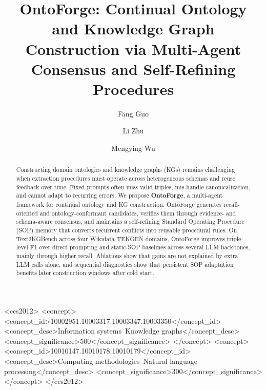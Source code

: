 \documentclass[sigconf]{acmart}
\begin{document}
\title{OntoForge: Continual Ontology and Knowledge Graph Construction via Multi-Agent Consensus and Self-Refining Procedures}

\author{Fang Guo}

\author{Li Zhu}

\author{Mengying Wu}

\renewcommand{\shortauthors}{Fang Guo, Li Zhu, and Mengying Wu}

\begin{CCSXML}
<ccs2012>
<concept>
<concept_id>10002951.10003317.10003347.10003350</concept_id>
<concept_desc>Information systems~Knowledge graphs</concept_desc>
<concept_significance>500</concept_significance>
</concept>
<concept>
<concept_id>10010147.10010178.10010179</concept_id>
<concept_desc>Computing methodologies~Natural language processing</concept_desc>
<concept_significance>300</concept_significance>
</concept>
</ccs2012>
\end{CCSXML}


\begin{abstract}
Constructing domain ontologies and knowledge graphs (KGs) remains challenging when extraction procedures must operate across heterogeneous schemas and reuse feedback over time. Fixed prompts often miss valid triples, mis-handle canonicalization, and cannot adapt to recurring errors. We propose \textbf{OntoForge}, a multi-agent framework for continual ontology and KG construction. OntoForge generates recall-oriented and ontology-conformant candidates, verifies them through evidence- and schema-aware consensus, and maintains a self-refining Standard Operating Procedure (SOP) memory that converts recurrent conflicts into reusable procedural rules. On Text2KGBench across four Wikidata-TEKGEN domains, OntoForge improves triple-level F1 over direct prompting and static-SOP baselines across several LLM backbones, mainly through higher recall. Ablations show that gains are not explained by extra LLM calls alone, and sequential diagnostics show that persistent SOP adaptation benefits later construction windows after cold start.
\end{abstract}
\end{document}
